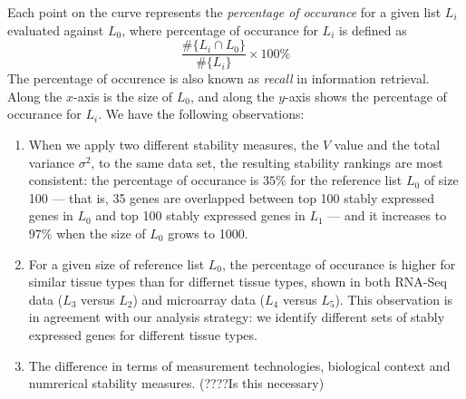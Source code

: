 \documentclass[11pt, a4paper]{article}
\begin{document}
Each point on the curve represents the \textit{percentage of occurance} for a given list $L_i$ evaluated against $L_0$, 
where percentage of occurance for $L_i$ is defined as 
 \[ \frac{ \#	 \{L_i\cap L_0\}}{\# \{L_i\}}\times 100\%\]
 The percentage of occurence is also known as \textit{recall} in
information retrieval.  Along the $x$-axis is the size of $L_0$, and along
the $y$-axis shows the percentage of occurance for $L_i$.  
We have the following observations:
\begin{enumerate}
    \item
	When we apply two different stability measures, the $V$ value and the total variance $\sigma^2$, to the same data set, the resulting stability rankings are
	most consistent: the percentage of occurance is $35\%$ for the reference list $L_0$ of size 100 --- that is, 35 genes are overlapped between top 100 stably expressed genes in $L_0$ and top 100 stably expressed genes in $L_1$ --- and it increases to $97\%$ when the size of $L_0$ grows to 1000.
    \item For a given size of reference list $L_0$, the percentage of occurance is higher for similar tissue types than for differnet tissue types, shown in both RNA-Seq data ($L_3$ versus $L_2$) and microarray data ($L_4$ versus $L_5$). This observation is in agreement with our analysis strategy: we identify
    different sets of stably expressed genes for different tissue types.
    \item The difference in terms of  measurement technologies, biological context and numrerical stability measures. (????Is this necessary)
\end{enumerate}


\end{document}
